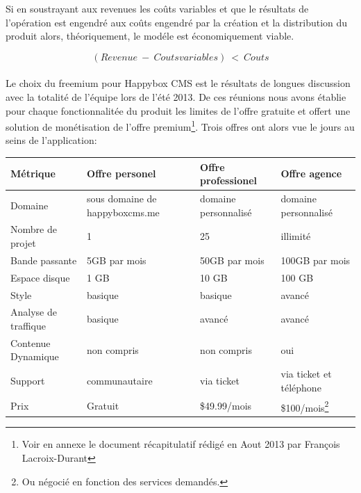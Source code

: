\documentclass[11pt, a4paper ]{article}
\begin{document}
Si en soustrayant aux revenues les coûts variables et que le résultats de l'opération est engendré aux coûts engendré par la création et la distribution du produit alors, théoriquement, le modéle est économiquement viable.

\begin{equation}
	(Revenue\ -\ Couts variables)\ <\ Couts 
\end{equation}

\paragraph{} %
Le choix du freemium pour Happybox CMS est le résultats de longues discussion avec la totalité de l'équipe lors de l'été 2013. De ces réunions nous avons établie pour chaque fonctionnalitée du produit les limites de l'offre gratuite et offert une solution de monétisation de l'offre premium\footnote{Voir en annexe le document récapitulatif rédigé en Aout 2013 par François Lacroix-Durant}.
Trois offres ont alors vue le jours au seins de l'application:

\begin{center}
	\begin{tabular}{| l | l | l | l |}
		Métrique & Offre personel & Offre professionel & Offre agence \\
		\hline
		Domaine & sous domaine de happyboxcms.me & domaine personnalisé & domaine personnalisé \\
		Nombre de projet & 1 & 25 & illimité \\
		Bande passante & 5GB par mois & 50GB par mois & 100GB par mois \\
		Espace disque & 1 GB & 10 GB & 100 GB \\
		Style & basique & basique & avancé \\
		Analyse de traffique & basique & avancé & avancé \\
		Contenue Dynamique & non compris & non compris & oui \\
		Support & communautaire & via ticket & via ticket et téléphone  \\
		Prix & Gratuit & \$49.99/mois & \$100/mois\footnote{Ou négocié en fonction des services demandés.} \\

	\end{tabular}
\end{center}
\end{document}
